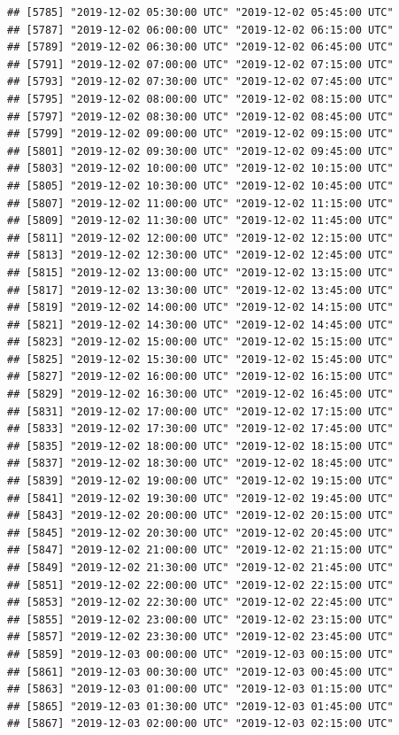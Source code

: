\documentclass{article}\usepackage[]{graphicx}\usepackage[]{color}
\makeatletter
\newenvironment{kframe}{%
 \def\at@end@of@kframe{}%
 \ifinner\ifhmode%
  \def\at@end@of@kframe{\end{minipage}}%
  \begin{minipage}{\columnwidth}%
 \fi\fi%
 \def\FrameCommand##1{\hskip\@totalleftmargin \hskip-\fboxsep
 \colorbox{shadecolor}{##1}\hskip-\fboxsep
     \hskip-\linewidth \hskip-\@totalleftmargin \hskip\columnwidth}%
 \MakeFramed {\advance\hsize-\width
   \@totalleftmargin\z@ \linewidth\hsize
   \@setminipage}}%
 {\par\unskip\endMakeFramed%
 \at@end@of@kframe}
\newenvironment{knitrout}{}{} %
\makeatother
\begin{document}
\begin{knitrout}
\begin{kframe}
\begin{verbatim}
## [5785] "2019-12-02 05:30:00 UTC" "2019-12-02 05:45:00 UTC"
## [5787] "2019-12-02 06:00:00 UTC" "2019-12-02 06:15:00 UTC"
## [5789] "2019-12-02 06:30:00 UTC" "2019-12-02 06:45:00 UTC"
## [5791] "2019-12-02 07:00:00 UTC" "2019-12-02 07:15:00 UTC"
## [5793] "2019-12-02 07:30:00 UTC" "2019-12-02 07:45:00 UTC"
## [5795] "2019-12-02 08:00:00 UTC" "2019-12-02 08:15:00 UTC"
## [5797] "2019-12-02 08:30:00 UTC" "2019-12-02 08:45:00 UTC"
## [5799] "2019-12-02 09:00:00 UTC" "2019-12-02 09:15:00 UTC"
## [5801] "2019-12-02 09:30:00 UTC" "2019-12-02 09:45:00 UTC"
## [5803] "2019-12-02 10:00:00 UTC" "2019-12-02 10:15:00 UTC"
## [5805] "2019-12-02 10:30:00 UTC" "2019-12-02 10:45:00 UTC"
## [5807] "2019-12-02 11:00:00 UTC" "2019-12-02 11:15:00 UTC"
## [5809] "2019-12-02 11:30:00 UTC" "2019-12-02 11:45:00 UTC"
## [5811] "2019-12-02 12:00:00 UTC" "2019-12-02 12:15:00 UTC"
## [5813] "2019-12-02 12:30:00 UTC" "2019-12-02 12:45:00 UTC"
## [5815] "2019-12-02 13:00:00 UTC" "2019-12-02 13:15:00 UTC"
## [5817] "2019-12-02 13:30:00 UTC" "2019-12-02 13:45:00 UTC"
## [5819] "2019-12-02 14:00:00 UTC" "2019-12-02 14:15:00 UTC"
## [5821] "2019-12-02 14:30:00 UTC" "2019-12-02 14:45:00 UTC"
## [5823] "2019-12-02 15:00:00 UTC" "2019-12-02 15:15:00 UTC"
## [5825] "2019-12-02 15:30:00 UTC" "2019-12-02 15:45:00 UTC"
## [5827] "2019-12-02 16:00:00 UTC" "2019-12-02 16:15:00 UTC"
## [5829] "2019-12-02 16:30:00 UTC" "2019-12-02 16:45:00 UTC"
## [5831] "2019-12-02 17:00:00 UTC" "2019-12-02 17:15:00 UTC"
## [5833] "2019-12-02 17:30:00 UTC" "2019-12-02 17:45:00 UTC"
## [5835] "2019-12-02 18:00:00 UTC" "2019-12-02 18:15:00 UTC"
## [5837] "2019-12-02 18:30:00 UTC" "2019-12-02 18:45:00 UTC"
## [5839] "2019-12-02 19:00:00 UTC" "2019-12-02 19:15:00 UTC"
## [5841] "2019-12-02 19:30:00 UTC" "2019-12-02 19:45:00 UTC"
## [5843] "2019-12-02 20:00:00 UTC" "2019-12-02 20:15:00 UTC"
## [5845] "2019-12-02 20:30:00 UTC" "2019-12-02 20:45:00 UTC"
## [5847] "2019-12-02 21:00:00 UTC" "2019-12-02 21:15:00 UTC"
## [5849] "2019-12-02 21:30:00 UTC" "2019-12-02 21:45:00 UTC"
## [5851] "2019-12-02 22:00:00 UTC" "2019-12-02 22:15:00 UTC"
## [5853] "2019-12-02 22:30:00 UTC" "2019-12-02 22:45:00 UTC"
## [5855] "2019-12-02 23:00:00 UTC" "2019-12-02 23:15:00 UTC"
## [5857] "2019-12-02 23:30:00 UTC" "2019-12-02 23:45:00 UTC"
## [5859] "2019-12-03 00:00:00 UTC" "2019-12-03 00:15:00 UTC"
## [5861] "2019-12-03 00:30:00 UTC" "2019-12-03 00:45:00 UTC"
## [5863] "2019-12-03 01:00:00 UTC" "2019-12-03 01:15:00 UTC"
## [5865] "2019-12-03 01:30:00 UTC" "2019-12-03 01:45:00 UTC"
## [5867] "2019-12-03 02:00:00 UTC" "2019-12-03 02:15:00 UTC"

\end{verbatim}
\end{kframe}
\end{knitrout}
\end{document}
